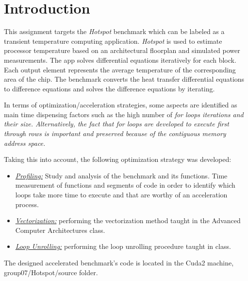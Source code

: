 \documentclass[conference]{IEEEtran}
\begin{document}
\section{Introduction}
    This assignment targets the \textit{Hotspot} benchmark which can be labeled as a transient temperature computing application. 
    \textit{Hotspot} is used to estimate processor temperature based on an architectural floorplan and simulated power measurements. The app solves differential equations iteratively for each block. Each output element represents the average temperature of the corresponding area of the chip. 
    The benchmark converts the heat transfer differential equations to difference equations and solves the difference equations by iterating. 
    
    In terms of optimization/acceleration strategies, some aspects are identified as main time dispensing factors such as the high number of \text\it{for} loops iterations and their size. Alternatively, the fact that \textit{for} loops are developed to execute first through rows is important and preserved because of the contiguous memory address space.
    
    Taking this into account, the following optimization strategy was developed:
    \begin{itemize}
        \item \underline{\textit{Profiling:}} Study and analysis of the benchmark and its functions. Time measurement of functions and segments of code in order to identify which loops take more time to execute and that are worthy of an acceleration process.
        
        \item \underline{\textit{Vectorization:}} performing the vectorization method taught in the Advanced Computer Architectures class\cite{b1}\cite{b2}.
        
        \item \underline{\textit{Loop Unrolling:}} performing the loop unrolling procedure taught in class\cite{b2}. 
    \end{itemize}
    
    The designed accelerated benchmark's code is located in the Cuda2 machine, group07/Hotspot/source folder.
    
    
\end{document}
